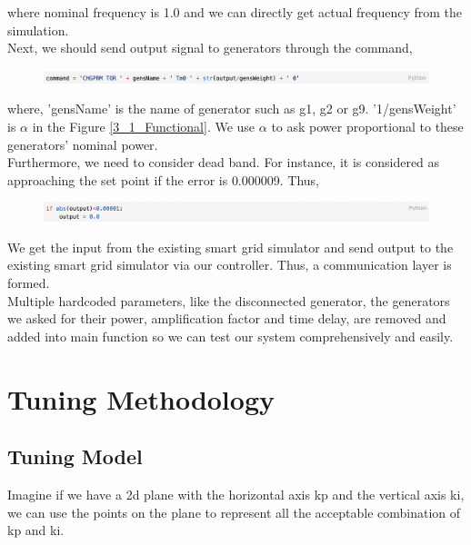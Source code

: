 \documentclass{report}
\begin{document}
where nominal frequency is 1.0 and we can directly get actual frequency from the simulation.\\

Next, we should send output signal to generators through the command,\\

\begin{figure}[htbp]
\centering
\includegraphics[width = \textwidth]{figure/3_3_code2.png}
\label{3_3_code2}
\end{figure}

where, 'gensName' is the name of generator such as g1, g2 or g9. '1/gensWeight' is $\alpha$ in the Figure \textcolor{red}{\ref{3_1_Functional}}. We use $\alpha$ to ask power proportional to these generators' nominal power. \\

Furthermore, we need to consider dead band. For instance, it is considered as approaching the set point if the error is 0.000009. Thus,\\

\begin{figure}[htbp]
\centering
\includegraphics[width = \textwidth]{figure/3_3_code3.png}
\label{3_3_code3}
\end{figure}

We get the input from the existing smart grid simulator and send output to the existing smart grid simulator via our controller. Thus, a communication layer is formed.\\

Multiple hardcoded parameters, like the disconnected generator, the generators we asked for their power, amplification factor and time delay, are removed and added into main function so we can test our system comprehensively and easily.\\


\section{Tuning Methodology } %
\subsection{Tuning Model} %
Imagine if we have a 2d plane with the horizontal axis kp and the vertical axis ki, we can use the points on the plane to represent all the acceptable combination of kp and ki.\\
\end{document}
